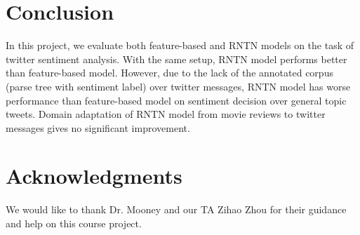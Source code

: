 \section{Conclusion}
\label{sec:conclusion}
In this project, we evaluate both feature-based and RNTN models on the task of twitter sentiment analysis. With the same setup, RNTN model performs better than feature-based model. However, due to the lack of the annotated corpus (parse tree with sentiment label) over twitter messages, RNTN model has worse performance than feature-based model on sentiment decision over general topic tweets. Domain adaptation of RNTN model from movie reviews to twitter messages gives no significant improvement. 




 

\section*{Acknowledgments}
We would like to thank Dr. Mooney and our TA Zihao Zhou for their guidance and help on this course project. 